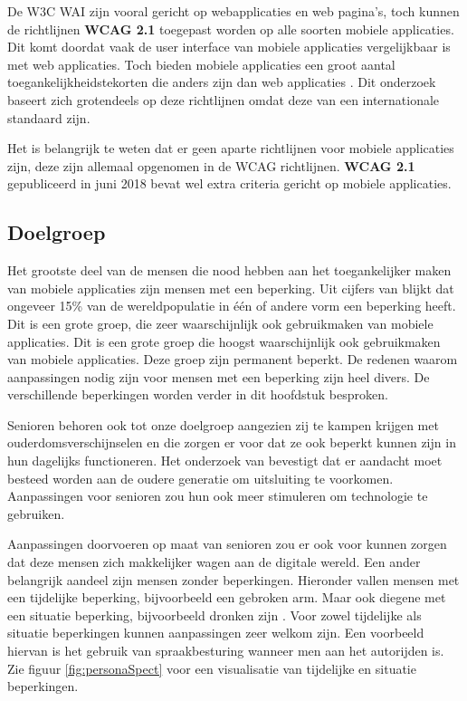 De W3C WAI zijn vooral gericht op webapplicaties en web pagina's, toch kunnen de richtlijnen \textbf{WCAG 2.1} toegepast worden op alle soorten mobiele applicaties. Dit komt doordat vaak de user interface van mobiele applicaties vergelijkbaar is met web applicaties. Toch bieden mobiele applicaties een groot aantal toegankelijkheidstekorten die anders zijn dan web applicaties \autocite{w3mobileConsider}. Dit onderzoek baseert zich grotendeels op deze richtlijnen omdat deze van een internationale standaard zijn.

Het is belangrijk te weten dat er geen aparte richtlijnen voor mobiele applicaties zijn, deze zijn allemaal opgenomen in de WCAG richtlijnen. \textbf{WCAG 2.1} gepubliceerd in juni 2018 bevat wel extra criteria gericht op mobiele applicaties.
\autocite{w3cMobileGuidelines}

\subsection{Doelgroep}
\label{sec:doelgroep}

Het grootste deel van de mensen die nood hebben aan het toegankelijker maken van mobiele applicaties zijn mensen met een beperking. Uit cijfers van \textcite{who2018} blijkt dat ongeveer 15\% van de wereldpopulatie in één of andere vorm een beperking heeft. Dit is een grote groep, die zeer waarschijnlijk ook gebruikmaken van mobiele applicaties. Dit is een grote groep die hoogst waarschijnlijk ook gebruikmaken van mobiele applicaties. Deze groep zijn permanent beperkt. De redenen waarom aanpassingen nodig zijn voor mensen met een beperking zijn heel divers. De verschillende beperkingen worden verder in dit hoofdstuk besproken. 

Senioren behoren ook tot onze doelgroep aangezien zij te kampen krijgen met ouderdomsverschijnselen en die zorgen er voor dat ze ook beperkt kunnen zijn in hun dagelijks functioneren. Het onderzoek van \textcite{diaz2014accessibility} bevestigt dat er aandacht moet besteed worden aan de oudere generatie om uitsluiting te voorkomen.  Aanpassingen voor senioren zou hun ook meer stimuleren om technologie te gebruiken.


Aanpassingen doorvoeren op maat van senioren zou er ook voor kunnen zorgen dat deze mensen zich makkelijker wagen aan de digitale wereld. Een ander belangrijk aandeel zijn mensen zonder beperkingen. Hieronder vallen mensen met een tijdelijke beperking, bijvoorbeeld een gebroken arm. Maar ook diegene met een situatie beperking, bijvoorbeeld dronken zijn \autocite{inclusiveMicrosoft}. Voor zowel tijdelijke als situatie beperkingen kunnen aanpassingen zeer welkom zijn. Een voorbeeld hiervan is het gebruik van spraakbesturing wanneer men aan het autorijden is. Zie figuur \ref{fig:personaSpect} voor een visualisatie van tijdelijke en situatie beperkingen.

